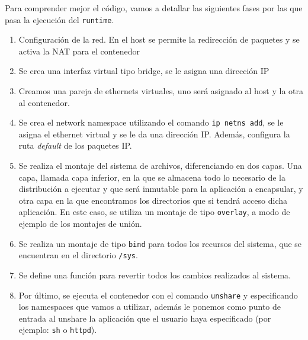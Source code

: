 \documentclass[a4paper, oneside, 12pt]{book}
\begin{document}
	\vspace{10px}

	\noindent Para comprender mejor el código, vamos a detallar las siguientes fases por las que pasa la ejecución del \texttt{runtime}.
	\begin{enumerate}
		\item Configuración de la red. En el host se permite la redirección de paquetes y se activa la NAT para el contenedor
		\item Se crea una interfaz virtual tipo bridge, se le asigna una dirección IP
		\item Creamos una pareja de ethernets virtuales, uno será asignado al host y la otra al contenedor.
		\item Se crea el network namespace utilizando el comando \texttt{ip netns add}, se le asigna el ethernet virtual y se le da una dirección IP. Además, configura la ruta \textit{default} de los paquetes IP.
		\item Se realiza el montaje del sistema de archivos, diferenciando en dos capas. Una capa, llamada capa inferior, en la que se almacena todo lo necesario de la distribución a ejecutar y que será inmutable para la aplicación a encapsular, y otra capa en la que encontramos los directorios que si tendrá acceso dicha aplicación. En este caso, se utiliza un montaje de tipo \texttt{overlay}, a modo de ejemplo de los montajes de unión.
		\item Se realiza un montaje de tipo \texttt{bind} para todos los recursos del sistema, que se encuentran en el directorio \texttt{/sys}.
		\item Se define una función para revertir todos los cambios realizados al sistema.
		\item Por último, se ejecuta el contenedor con el comando \texttt{unshare} y especificando los namespaces que vamos a utilizar, además le ponemos como punto de entrada al unshare la aplicación que el usuario haya especificado (por ejemplo: \texttt{sh} o \texttt{httpd}).
	\end{enumerate}

	\pagebreak
	
\end{document}
